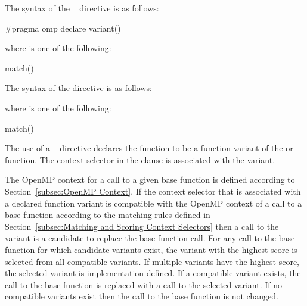 \syntax
\begin{ccppspecific}
\begin{samepage}
The syntax of the ~ directive is as follows:

\begin{ompcPragma}
#pragma omp declare variant() 
\end{ompcPragma}
\end{samepage}

\begin{samepage}
where  is one of the following{}:

\begin{indentedcodelist}
match()
\end{indentedcodelist}
\end{samepage}
\end{ccppspecific}

\begin{fortranspecific}
The syntax of the  directive is as follows:


where  is one of the following{}:

\begin{indentedcodelist}
match()
\end{indentedcodelist}
\end{fortranspecific}

\descr

The use of a ~ directive declares the function to
be a function variant of the  or 
function. The context selector in the  clause is associated 
with the variant.

The OpenMP context for a call to a given base function is defined according 
to Section~\ref{subsec:OpenMP Context}. If the context selector that is 
associated with a declared function variant is compatible with the OpenMP 
context of a call to a base function according to the matching rules defined in
Section~\ref{subsec:Matching and Scoring Context Selectors} then a call to
the variant is a candidate to replace the base function call. For any call
to the base function for which candidate variants exist, the variant with 
the highest score is selected from all compatible variants. If multiple 
variants have the highest score, the selected variant is implementation 
defined. If a compatible variant exists, the call to the base function is 
replaced with a call to the selected variant. If no compatible variants 
exist then the call to the base function is not changed.

